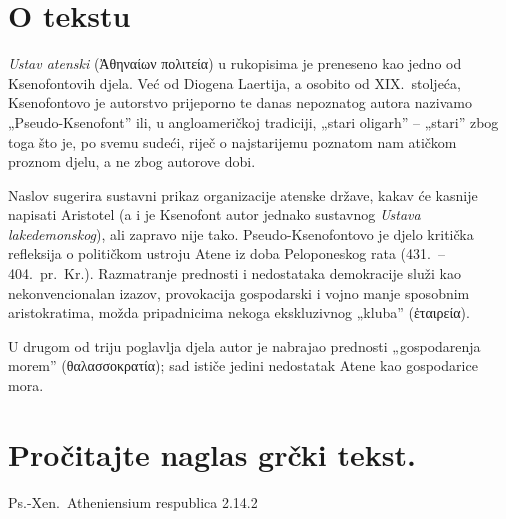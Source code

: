 


\section*{O tekstu}
\textit{Ustav atenski} \textgreek[variant=ancient]{(Ἀθηναίων πολιτεία)} u rukopisima je preneseno kao jedno od Ksenofontovih djela. Već od Diogena Laertija, a osobito od XIX.~stoljeća, Ksenofontovo je autorstvo prijeporno te danas nepoznatog autora nazivamo „Pseudo-Ksenofont'' ili, u angloameričkoj tradiciji, „stari oligarh'' – „stari'' zbog toga što je, po svemu sudeći, riječ o najstarijemu poznatom nam atičkom proznom djelu, a ne zbog autorove dobi.

Naslov sugerira sustavni prikaz organizacije atenske države, kakav će kasnije napisati Aristotel (a i je Ksenofont autor jednako sustavnog \textit{Ustava lakedemonskog}), ali zapravo nije tako. Pseudo-Ksenofontovo je djelo kritička refleksija o političkom ustroju Atene iz doba Peloponeskog rata  (431.\ – 404.\ pr.~Kr.). Razmatranje prednosti i nedostataka demokracije služi kao nekonvencionalan izazov, provokacija gospodarski i vojno manje sposobnim aristokratima, možda pripadnicima nekoga ekskluzivnog „kluba'' \textgreek[variant=ancient]{(ἑταιρεία).}

U drugom od triju poglavlja djela autor je nabrajao prednosti „gospodarenja morem'' \textgreek[variant=ancient]{(θαλασσοκρατία);} sad ističe jedini nedostatak Atene kao gospodarice mora.


\newpage

\section*{Pročitajte naglas grčki tekst.}
Ps.-Xen.\ Atheniensium respublica 2.14.2

\medskip

